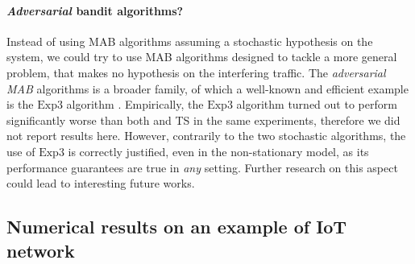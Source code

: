\paragraph{\emph{Adversarial} bandit algorithms?}

Instead of using MAB algorithms assuming a stochastic hypothesis on the system, we could try to use MAB algorithms designed to tackle a more general problem, that makes no hypothesis on the interfering traffic.
The \emph{adversarial MAB} algorithms is a broader family, of which a well-known and efficient example is the $\mathrm{Exp}3$ algorithm \cite{Bubeck12}.
Empirically, the $\mathrm{Exp}3$ algorithm turned out to perform significantly worse than both \UCB{} and TS in the same experiments,
therefore we did not report results here.
However, contrarily to the two stochastic algorithms, the use of $\mathrm{Exp}3$ is correctly justified, even in the non-stationary model, as its performance guarantees are true in \emph{any} setting.
Further research on this aspect could lead to interesting future works.



\subsection{Numerical results on an example of IoT network}\label{sub:41:numericalResults}

